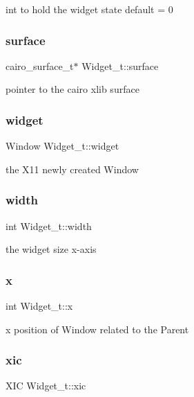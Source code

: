 int to hold the widget state default = 0 \mbox{\label{structWidget__t_ae9b5979742ea31817ff7d7b34a56f88d}} 
\subsubsection{\texorpdfstring{surface}{surface}}
{\footnotesize\ttfamily cairo\+\_\+surface\+\_\+t$\ast$ Widget\+\_\+t\+::surface}

pointer to the cairo xlib surface \mbox{\label{structWidget__t_acb2bfb41674371ee1220a9d6a2d89fb1}} 
\subsubsection{\texorpdfstring{widget}{widget}}
{\footnotesize\ttfamily Window Widget\+\_\+t\+::widget}

the X11 newly created Window \mbox{\label{structWidget__t_a3204c88196ed5793250b3530dd719037}} 
\subsubsection{\texorpdfstring{width}{width}}
{\footnotesize\ttfamily int Widget\+\_\+t\+::width}

the widget size x-\/axis \mbox{\label{structWidget__t_aac6ce7621b682bb4ce88bac9181c34a7}} 
\subsubsection{\texorpdfstring{x}{x}}
{\footnotesize\ttfamily int Widget\+\_\+t\+::x}

x position of Window related to the Parent \mbox{\label{structWidget__t_adafb1b98ea551ef726be6c726ac2e817}} 
\subsubsection{\texorpdfstring{xic}{xic}}
{\footnotesize\ttfamily X\+IC Widget\+\_\+t\+::xic}

